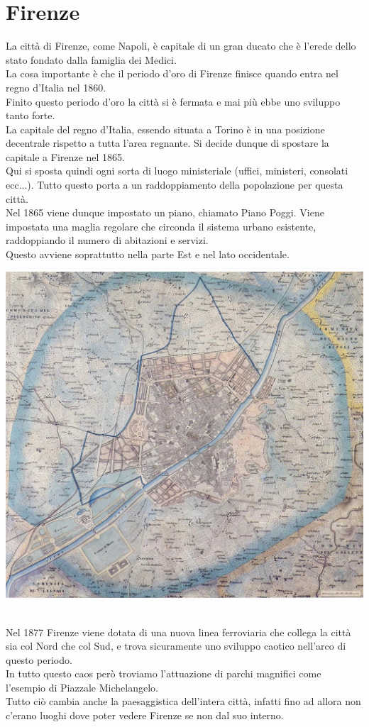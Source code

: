 \documentclass[a4paper,12pt, oneside]{book}
\begin{document}
  \section{Firenze}
  La città di Firenze, come Napoli, è capitale di un gran ducato che è l'erede dello stato fondato dalla famiglia  dei Medici.\\ La cosa importante è che il periodo d'oro di Firenze finisce quando entra nel regno d'Italia nel 1860.\\ Finito questo periodo d'oro la città si è fermata e mai più ebbe uno sviluppo tanto forte.\\
  La capitale del regno d'Italia, essendo situata a Torino è in una posizione decentrale rispetto a tutta l'area regnante. Si decide dunque di spostare la capitale a Firenze nel 1865.\\
  Qui si sposta quindi ogni sorta di luogo ministeriale (uffici, ministeri, consolati ecc...). Tutto questo porta a un raddoppiamento della popolazione per questa città.\\ Nel 1865 viene dunque impostato un piano, chiamato Piano Poggi. Viene impostata una maglia regolare che circonda il sistema urbano esistente, raddoppiando il numero di abitazioni e servizi.\\ Questo avviene soprattutto nella parte Est e nel lato occidentale.\\
  \begin{center}
  	\includegraphics[width=0.6\linewidth]{"immagini/Piano_Poggi_(Firenze,_1865)_-_1"}
  	\label{fig:Piano Poggi (Firenze, 1865)}
  \end{center}
  \leavevmode\\ 
  Nel 1877 Firenze viene dotata di una nuova linea ferroviaria che collega la città sia col Nord che col Sud, e trova sicuramente uno sviluppo caotico nell'arco di questo periodo.\\ In tutto questo caos però troviamo l'attuazione di parchi magnifici come l'esempio di Piazzale Michelangelo.\\ Tutto ciò cambia anche la paesaggistica dell'intera città, infatti fino ad allora non c'erano luoghi dove poter vedere Firenze se non dal suo interno.\\
\end{document}
